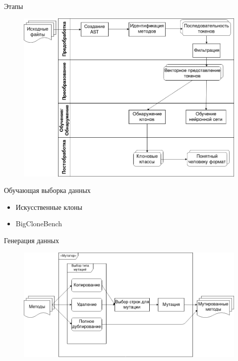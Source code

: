\documentclass[russian,ignorenonframetext,]{beamer}
\providecommand{\tightlist}{%
  \setlength{\itemsep}{0pt}\setlength{\parskip}{0pt}}
\renewcommand{\caption}[1]{}
\begin{document}
\begin{frame}{Этапы}
\protect\hypertarget{ux44dux442ux430ux43fux44b}{}

\begin{figure}
\centering
\includegraphics{struct}
\caption{stages}
\end{figure}

\end{frame}

\begin{frame}{Обучающая выборка данных}
\protect\hypertarget{ux43eux431ux443ux447ux430ux44eux449ux430ux44f-ux432ux44bux431ux43eux440ux43aux430-ux434ux430ux43dux43dux44bux445}{}

\begin{itemize}
\tightlist
\item
  Искусственные клоны
\item
  BigCloneBench
\end{itemize}

\end{frame}

\begin{frame}{Генерация данных}
\protect\hypertarget{ux433ux435ux43dux435ux440ux430ux446ux438ux44f-ux434ux430ux43dux43dux44bux445}{}

\begin{figure}
\centering
\includegraphics{mut_stages}
\caption{mutator}
\end{figure}

\end{frame}
\end{document}
